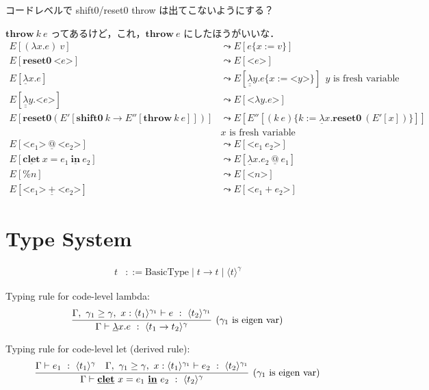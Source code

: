 \documentclass[10pt,a4j]{jarticle}
\makeatletter
\newcommand\fun[2]{\lambda{#1}.{#2}}
\newcommand\Resetz{\textbf{reset0}}
\newcommand\Shiftz{\textbf{shift0}}
\newcommand\Throw{\textbf{throw}}
\newcommand\resetz[1]{\Resetz~{#1}}
\newcommand\cfun[2]{\underline{\lambda}{#1}.{#2}}
\newcommand\ccfun[2]{\underline{\underline{\lambda}}{#1}.{#2}}
\newcommand\cResetz{\underline{\textbf{reset0}}}
\newcommand\cShiftz{\underline{\textbf{shift0}}}
\newcommand\cThrow{\underline{\textbf{throw}}}
\newcommand\cPlus{\underline{\textbf{+}}}
\newcommand\cLet{\underline{\textbf{clet}}}
\newcommand\cIn{\underline{\textbf{in}}}
\newcommand\clet[3]{\cLet~{#1}={#2}~\cIn~{#3}}
\newcommand\code[1]{\texttt{<}{#1}\texttt{>}}
\newcommand\codeT[2]{\langle{#1}\rangle^{#2}}
\newcommand\ord{\ge}
\newcommand\lto{\leadsto}
\newcommand\cat{~\underline{@}~}
\makeatother
\begin{document}
コードレベルで shift0/reset0 throw は出てこないようにする？

$\Throw~ k~ e$ ってあるけど，これ，$\Throw~ e$ にしたほうがいいな．
\begin{align*}
  E[(\fun{x}{e})~v] &\lto E[e\{ x := v \}] \\
  E[\Resetz~\code{e}] &\lto E[\code{e}] \\
  E[\cfun{x}{e}] &\lto E[\ccfun{y}{e\{ x := \code{y} \}}] ~~y \text{ is fresh variable} \\
  E[\ccfun{y}{\code{e}}] &\lto E[\code{\fun{y}{e}}] \\
  E[\Resetz (E'[\Shiftz~ k \to E''[\Throw~ k~ e]])] &\lto E[E''[(k~ e)\{k := \cfun{x}{\Resetz~ (E'[x])} \}]] \\
                    &x \text{ is fresh variable} \\
  E[\code{e_1} \cat \code{e_2}] &\lto E[\code{e_1~ e_2}] \\
  E[\clet{x}{e_1}{e_2}] &\lto E[\cfun{x}{e_2} \cat e_1] \\
  E[\% n] &\lto E[\code{n}] \\
  E[\code{e_1}~ \cPlus~ \code{e_2}] &\lto E[\code{e_1 + e_2}]
\end{align*}

\section{Type System}

\begin{align*}
  t & ::= \textrm{BasicType} \mid t \to t \mid \codeT{t}{\gamma}
\end{align*}

Typing rule for code-level lambda:
\[
  \infer[(\gamma_1~\text{is eigen var})]
  {\Gamma \vdash \cfun{x}{e} ~:~ \codeT{t_1\to t_2}{\gamma}}
  {\Gamma,~\gamma_1 \ord \gamma,~x:\codeT{t_1}{\gamma_1} \vdash e
    ~:~ \codeT{t_2}{\gamma_1}}
\]

Typing rule for code-level let (derived rule):
\[
  \infer[(\gamma_1~\text{is eigen var})]
  {\Gamma \vdash \clet{x}{e_1}{e_2} ~:~ \codeT{t_2}{\gamma}}
  {\Gamma \vdash e_1 ~:~ \codeT{t_1}{\gamma}
    &\Gamma,~\gamma_1 \ord \gamma,~x:\codeT{t_1}{\gamma_1} \vdash
    e_2 ~:~ \codeT{t_2}{\gamma_1}
  }
\]
\end{document}
